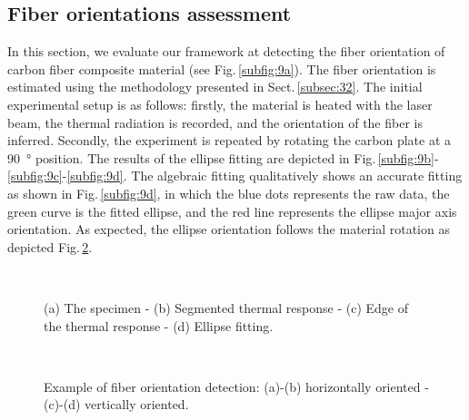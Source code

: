 \subsection{Fiber orientations assessment}

In this section, we evaluate our framework at detecting the fiber orientation of carbon fiber composite material (see Fig.\,\ref{subfig:9a}).
The fiber orientation is estimated using the methodology presented in Sect.\,\ref{subsec:32}.
The initial experimental setup is as follows: 
firstly, the material is heated with the laser beam, the thermal radiation is recorded, and the orientation of the fiber is inferred. 
Secondly, the experiment is repeated by rotating the carbon plate at a \SI{90}{\degree} position.
The results of the ellipse fitting are depicted in Fig.\,\ref{subfig:9b}-\ref{subfig:9c}-\ref{subfig:9d}.
The algebraic fitting qualitatively shows an accurate fitting as shown in Fig.\,\ref{subfig:9d}, in which the blue dots represents the raw data, the green curve is the fitted ellipse, and the red line represents the ellipse major axis orientation.
As expected, the ellipse orientation follows the material rotation as depicted Fig.\,\ref{fig:10}.

\begin{figure}
  \centering
  \hspace*{\fill}
  \hspace*{\fill} \\ \hspace*{\fill}
   \hfill
   \hfill
  \hspace*{\fill}
  \caption{(a) The specimen - (b) Segmented thermal response - (c) Edge of the thermal response - (d) Ellipse fitting.}
  \label{fig:9}
\end{figure}

\begin{figure}
  \centering
  \hspace*{\fill}
   \hfill
  \hspace*{\fill} \\ \hspace*{\fill}
   \hfill
  \hspace*{\fill}
  \caption{Example of fiber orientation detection: (a)-(b) horizontally oriented - (c)-(d)
	vertically oriented.}
  \label{fig:10}
\end{figure}

